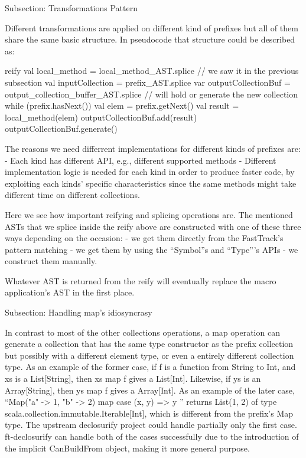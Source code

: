 Subsection: Transformations Pattern

Different transformations are applied on different kind of prefixes but all of
them share the same basic structure. In pseudocode that structure could be
described as:

reify {
  val local_method = local_method_AST.splice // we saw it in the previous
subsection
  val inputCollection = prefix_AST.splice
  var outputCollectionBuf = output_collection_buffer_AST.splice // will
hold or generate the new collection
  while (prefix.hasNext()) {
    val elem = prefix.getNext()
    val result = local_method(elem)
    outputCollectionBuf.add(result)
  }
  outputCollectionBuf.generate()
}

The reasons we need differrent implementations for different kinds of
prefixes are:
- Each kind has different API, e.g., different supported methods
- Different implementation logic is needed for each kind in order to produce
faster code, by exploiting each kinds' specific characteristics since the same
methods might take different time on different collections.

Here we see how important reifying and splicing operations are. The mentioned
ASTs that we splice inside the reify above are constructed with one of these
three ways depending on the occasion:
- we get them directly from the FastTrack's pattern matching
- we get them by using the ``Symbol''s and ``Type'''s APIs
- we construct them manually.

Whatever AST is returned from the reify will eventually replace the macro
application's AST in the first place.


Subsection: Handling map's idiosyncrasy

In contrast to most of the other collections operations, a map operation can
generate a collection that has the same type constructor as the prefix
collection but possibly with a different element type, or even a entirely
different collection type. As an example of the former case, if f is a function
from String to Int, and xs is a List[String], then xs map f gives a List[Int].
Likewise, if ys is an Array[String], then ys map f gives a Array[Int]. As an
example of the later case,   ``Map("a" -> 1, "b" -> 2) map { case (x, y) => y
}'' returns List(1, 2) of type scala.collection.immutable.Iterable[Int],
which is different from the prefix's Map type. The upstream declosurify project
could handle partially only the first case. ft-declosurify can handle both of
the cases successfully due to the introduction of the implicit CanBuildFrom
object, making it more general purpose.


